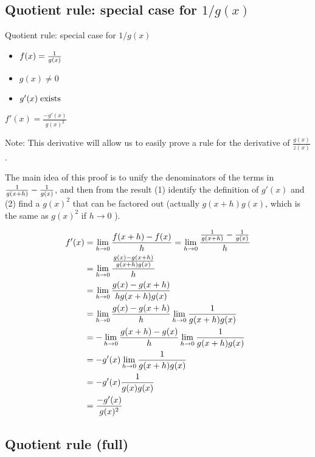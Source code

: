 \subsection{Quotient rule: special case for $1/g(x)$}

\begin{property}{Quotient rule: special case for $1/g(x)$}
\begin{precondition}
    \begin{itemize}
      \item $f(x)=\frac{1}{g(x)}$
      \item $g(x) \neq 0$
      \item $g'(x)    \; \text{exists} \;$
    \end{itemize}
  \end{precondition}
\begin{claim}
    $f'(x)=\frac{-g'(x) }{g(x)^2}$
\end{claim}
\begin{Proof}

Note: This derivative will allow us to easily prove a rule for the derivative of $\frac{g(x)}{z(x)}$.

The main idea of this proof is to unify the denominators of the terms in $\frac{1}{g(x+h)} - \frac{1}{g(x)}$, and then from the result (1) identify the definition of $g'(x)$ and (2) find a $g(x)^2$ that can be factored out (actually $g(x+h) g(x)$, which is the same as $g(x)^2$ if $h \rightarrow 0$ ).


\begin{align*}
f'(x)&=\lim\limits_{h \rightarrow 0}  \frac{f(x+h)-f(x)}{h} = \lim\limits_{h \rightarrow 0}  \frac{\frac{1}{g(x+h)} - \frac{1}{g(x)}}{h}
\\ &= \lim\limits_{h \rightarrow 0}  \frac{ \frac{g(x)-g(x+h)}{g(x+h)g(x)} }{h}
\\ &= \lim\limits_{h \rightarrow 0}  \frac{ g(x)-g(x+h) }{h g(x+h)g(x)}
\\ &= \lim\limits_{h \rightarrow 0}  \frac{ g(x)-g(x+h) }{h } \lim\limits_{h \rightarrow 0} \frac{1}{g(x+h)g(x)}
\\ &=- \lim\limits_{h \rightarrow 0}  \frac{g(x+h)- g(x) }{h } \lim\limits_{h \rightarrow 0} \frac{1}{g(x+h)g(x)}
\\ &= -g'(x) \lim\limits_{h \rightarrow 0} \frac{1}{g(x+h)g(x)}
\\ &= -g'(x) \frac{1}{g(x)g(x)}
\\&= \frac{-g'(x) }{g(x)^2}
\end{align*}
\end{Proof}
\end{property}

\subsection{Quotient rule (full)}

